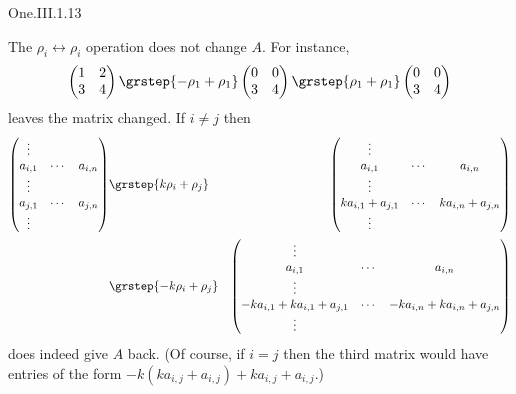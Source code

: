 \begin{ans}{One.III.1.13}
    \begin{exparts}
      \partsitem The $\rho_i\leftrightarrow\rho_i$ operation does not
        change $A$.
      \partsitem For instance,
        \begin{equation*}
          \begin{pmatrix}
            1  &2  \\
            3  &4
          \end{pmatrix}
          \grstep{-\rho_1+\rho_1}
          \begin{pmatrix}
            0  &0  \\
            3  &4
          \end{pmatrix}
          \grstep{\rho_1+\rho_1}
          \begin{pmatrix}
            0  &0  \\
            3  &4
          \end{pmatrix}
        \end{equation*}
        leaves the matrix changed.
      \partsitem If $i\neq j$ then
        \begin{eqnarray*}
          \begin{pmatrix}
            \vdots                     \\
            a_{i,1}  &\cdots  &a_{i,n}  \\
            \vdots                     \\
            a_{j,1}  &\cdots  &a_{j,n}  \\
            \vdots
          \end{pmatrix}
          &\grstep{k\rho_i+\rho_j}
          &\begin{pmatrix}
            \vdots                                      \\
            a_{i,1}           &\cdots  &a_{i,n}          \\
            \vdots                                      \\
            ka_{i,1}+a_{j,1}  &\cdots  &ka_{i,n}+a_{j,n}  \\
            \vdots
          \end{pmatrix}                                        \\
          &\grstep{-k\rho_i+\rho_j}
          &\begin{pmatrix}
            \vdots                                      \\
            a_{i,1}           &\cdots  &a_{i,n}          \\
            \vdots                                      \\
            -ka_{i,1}+ka_{i,1}+a_{j,1}  &\cdots &-ka_{i,n}+ka_{i,n}+a_{j,n} \\
            \vdots
          \end{pmatrix}
        \end{eqnarray*}
        does indeed give $A$ back.
        (Of course, if $i=j$ then the third matrix would have entries of the
        form $-k(ka_{i,j}+a_{i,j})+ka_{i,j}+a_{i,j}$.)
    \end{exparts}
   
\end{ans}
